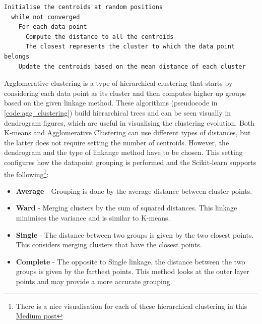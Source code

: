 \begin{lstlisting}[float=!hb, caption={K-means pseudocode}, label={code:k-means}]
  Initialise the centroids at random positions
  while not converged 
    For each data point
      Compute the distance to all the centroids
      The closest represents the cluster to which the data point belongs
    Update the centroids based on the mean distance of each cluster
\end{lstlisting} 

Agglomerative clustering is a type of hierarchical clustering that starts by considering each data point as its cluster and then computes higher up groups based on the given linkage method. These algorithms (pseudocode in \cref{code:agg_clustering}) build hierarchical trees and can be seen visually in dendrogram figures, which are useful in visualising the clustering evolution. Both K-means and Agglomerative Clustering can use different types of distances, but the latter does not require setting the number of centroids. However, the dendrogram  and the type of linkange method have to be chosen. This setting configures how the datapoint grouping is performed and the Scikit-learn supports the following\footnote{There is a nice visualisation for each of these hierarchical clustering in this \href{https://towardsdatascience.com/machine-learning-algorithms-part-12-hierarchical-agglomerative-clustering-example-in-python-1e18e0075019}{Medium post}}:
\begin{itemize}
  \item \textbf{Average} - Grouping is done by the average distance between cluster points.
  \item \textbf{Ward} - Merging clusters by the sum of squared distances. This linkage minimises the variance and is similar to K-means.
  \item \textbf{Single} - The distance between two groups is given by the two closest points. This considers merging clusters that have the closest points.
  \item \textbf{Complete} - The opposite to Single linkage, the distance between the two groups is given by the farthest points. This method looks at the outer layer points and may provide a more accurate grouping.
\end{itemize}


